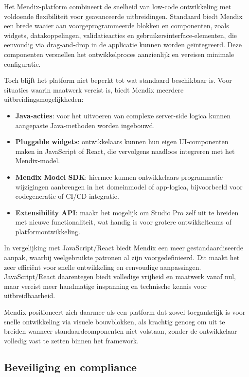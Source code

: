 Het Mendix-platform combineert de snelheid van low-code ontwikkeling met voldoende flexibiliteit voor geavanceerde uitbreidingen. Standaard biedt Mendix een brede waaier aan voorgeprogrammeerde blokken en componenten, zoals widgets, datakoppelingen, validatieacties en gebruikersinterface-elementen, die eenvoudig via drag-and-drop in de applicatie kunnen worden geïntegreerd. Deze componenten versnellen het ontwikkelproces aanzienlijk en vereisen minimale configuratie.

Toch blijft het platform niet beperkt tot wat standaard beschikbaar is. Voor situaties waarin maatwerk vereist is, biedt Mendix meerdere uitbreidingsmogelijkheden:
\begin{itemize}
    \item \textbf{Java-acties}: voor het uitvoeren van complexe server-side logica kunnen aangepaste Java-methoden worden ingebouwd.
    \item \textbf{Pluggable widgets}: ontwikkelaars kunnen hun eigen UI-componenten maken in JavaScript of React, die vervolgens naadloos integreren met het Mendix-model.
    \item \textbf{Mendix Model SDK}: hiermee kunnen ontwikkelaars programmatic wijzigingen aanbrengen in het domeinmodel of app-logica, bijvoorbeeld voor codegeneratie of CI/CD-integratie.
    \item \textbf{Extensibility \gls{API}}: maakt het mogelijk om Studio Pro zelf uit te breiden met nieuwe functionaliteit, wat handig is voor grotere ontwikkelteams of platformontwikkeling.
\end{itemize}

In vergelijking met JavaScript/React biedt Mendix een meer gestandaardiseerde aanpak, waarbij veelgebruikte patronen al zijn voorgedefinieerd. Dit maakt het zeer efficiënt voor snelle ontwikkeling en eenvoudige aanpassingen. JavaScript/React daarentegen biedt volledige vrijheid en maatwerk vanaf nul, maar vereist meer handmatige inspanning en technische kennis voor uitbreidbaarheid.

Mendix positioneert zich daarmee als een platform dat zowel toegankelijk is voor snelle ontwikkeling via visuele bouwblokken, als krachtig genoeg om uit te breiden wanneer standaardcomponenten niet volstaan, zonder de ontwikkelaar volledig vast te zetten binnen het framework.


\subsection{Beveiliging en compliance}

